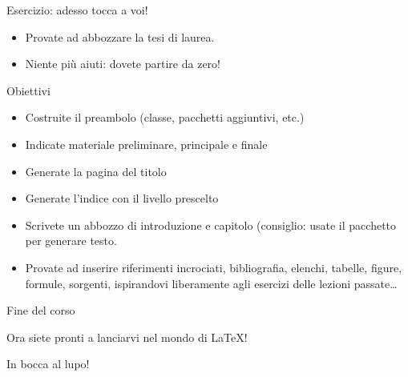 \documentclass{beamer}
\begin{document}
\begin{frame}{Esercizio: adesso tocca a voi!}
\begin{itemize}
\item Provate ad abbozzare la  tesi di laurea.
\item Niente pi\`u aiuti: dovete partire da zero!
\end{itemize}

\begin{block}{Obiettivi}
\begin{itemize}
\item Costruite il preambolo (classe, pacchetti aggiuntivi, etc.)
\item Indicate  materiale preliminare, principale e finale
\item Generate la pagina del titolo
\item Generate l'indice con il livello prescelto
\item Scrivete un abbozzo di introduzione e capitolo (consiglio: usate il pacchetto  per generare testo.
\item Provate ad inserire riferimenti incrociati, bibliografia, elenchi, tabelle, figure, formule, sorgenti, ispirandovi liberamente agli esercizi delle lezioni passate\ldots
\end{itemize}
\end{block}

\end{frame}

\begin{frame}{Fine del corso}
\begin{center}
Ora siete pronti a lanciarvi nel mondo di \LaTeX{}!

In bocca al lupo!

\end{center}
\end{frame}
\end{document}
